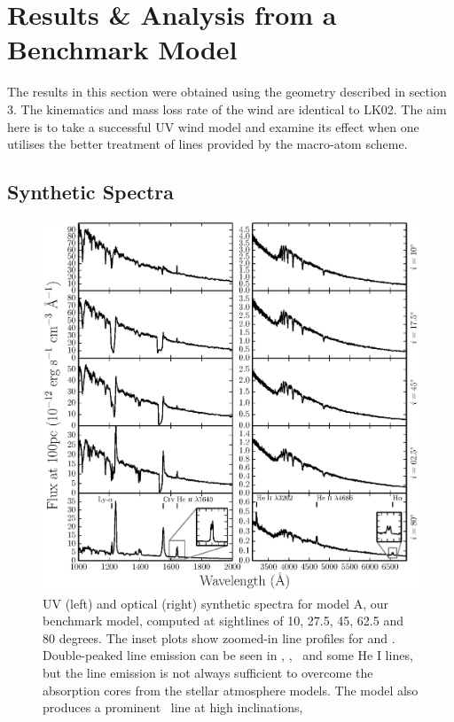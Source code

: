 \documentclass[preprint, a4paper, 11pt]{aastex}
\begin{document}
%
%

\section{Results \& Analysis from a Benchmark Model}

The results in this section were obtained using the geometry described
in section 3. The kinematics and mass loss rate of the wind are identical
to LK02. 
The aim here is to 
take a successful UV wind model and examine its effect 
when one utilises the better treatment of lines provided
by the macro-atom scheme.

\subsection{Synthetic Spectra}

\begin{figure} %
\includegraphics[width=\textwidth]{figures/fig5_uv_opt.eps}
\caption{
UV (left) and optical (right) synthetic spectra for model A, our benchmark model,
computed at sightlines of 10, 27.5, 45, 62.5 and 80 degrees.	
The inset plots show zoomed-in line profiles for 
\heiiuv and \ha. Double-peaked line emission can be seen in 
\heiiuv, \heiiopt, \ha\ and some He I lines, but the 
line emission is not always sufficient to overcome the absorption
cores from the stellar atmosphere models. The model
also produces a prominent \heiioptnew\ line at high inclinations,
}
\label{spec}
\end{figure} %
\end{document}
